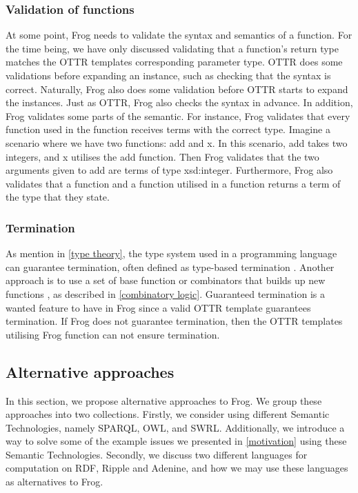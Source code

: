 \subsubsection{Validation of functions}
At some point, Frog needs to validate the syntax and semantics of a function. For the time being, we have only discussed validating that a function's return type matches the OTTR templates corresponding parameter type. OTTR does some validations before expanding an instance, such as checking that the syntax is correct. Naturally, Frog also does some validation before OTTR starts to expand the instances. Just as OTTR, Frog also checks the syntax in advance. In addition, Frog validates some parts of the semantic. For instance, Frog validates that every function used in the function receives terms with the correct type. Imagine a scenario where we have two functions: add and x. In this scenario, add takes two integers, and x utilises the add function. Then Frog validates that the two arguments given to add are terms of type xsd:integer. Furthermore, Frog also validates that a function and a function utilised in a function returns a term of the type that they state.

\subsubsection{Termination}
As mention in \autoref{type theory}, the type system used in a programming language can guarantee termination, often defined as type-based termination \autocite{TypeTermination}. Another approach is to use a set of base function or combinators that builds up new functions \autocite{TypeTermination}, as described in \autoref{combinatory logic}. Guaranteed termination is a wanted feature to have in Frog since a valid OTTR template guarantees termination. If Frog does not guarantee termination, then the OTTR templates utilising Frog function can not ensure termination. 


\subsection{Alternative approaches}
In this section, we propose alternative approaches to Frog. We group these approaches into two collections. Firstly, we consider using different Semantic Technologies, namely SPARQL, OWL, and SWRL. Additionally, we introduce a way to solve some of the example issues we presented in \autoref{motivation} using these Semantic Technologies. Secondly, we discuss two different languages for computation on RDF, Ripple and Adenine, and how we may use these languages as alternatives to Frog.

